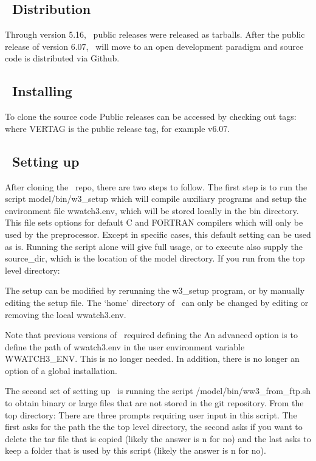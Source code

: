 \vssub
\subsection{~Distribution}\label{sec:install}
\vssub

\noindent Through version 5.16, \ws\ public releases were released as tarballs. 
After the public release of version 6.07, \ws\ will move to an open development 
paradigm and source code is distributed via Github. 

\vssub
\subsection{~Installing}
\vssub

To clone the source code
Public releases can be accessed by checking out tags: 
where VERTAG is the public release tag, for example v6.07. 

\vssub
\subsection{~Setting up}
\vssub

After cloning the \ws\ repo, there are two steps to follow.  The first step 
is to run the script {\file model/bin/w3\_setup} which will compile auxiliary 
programs and setup the environment file {\file wwatch3.env}, which will be 
stored locally in the bin directory. This file sets options for default C 
and FORTRAN compilers which will only be used by the preprocessor. Except 
in specific cases, this default setting can be used as is. Running the 
script alone will give full usage, or to execute also supply the source\_dir, 
which is the location of the {\file model} directory.  If you run from the 
top level directory: 

The setup can be modified by rerunning the {\file w3\_setup} program, or by 
manually editing the setup file. The `home' directory of \ws\ can only be 
changed by editing or removing the local {\file wwatch3.env}.

Note that previous versions of \ws\ required defining the 
An advanced option is to define the path of {\file wwatch3.env} in the 
user environment variable {\code WWATCH3\_ENV}. This is no longer needed. 
In addition, there is no longer an option of a global installation. 

The second set of setting up \ws\ is running the script 
{\file /model/bin/ww3\_from\_ftp.sh} to obtain binary or large 
files that are not stored in the git repository.  From the top directory: 
There are three prompts requiring user input in this script.  The first asks 
for the path the the top level directory, the second asks if you want to delete
the tar file that is copied (likely the answer is n for no) and the last asks 
to keep a folder that is used by this script (likely the answer is n for no).  

